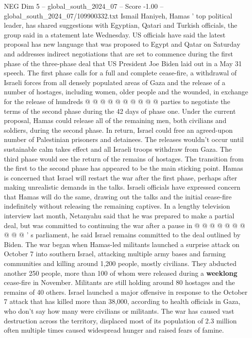 \begin{textsample}{NEG Dim 5 – global\_south\_2024\_07 – Score -1.00 – global\_south\_2024\_07/109900332.txt}
Ismail Haniyeh, Hamas ' top political leader, has shared suggestions with Egyptian, Qatari and Turkish officials, the group said in a statement late Wednesday.
US officials have said the latest proposal has new language that was proposed to Egypt and Qatar on Saturday and addresses indirect negotiations that are set to commence during the first phase of the three-phase deal that US President Joe Biden laid out in a May 31 speech.
The first phase calls for a full and complete cease-fire, a withdrawal of Israeli forces from all densely populated areas of Gaza and the release of a number of hostages, including women, older people and the wounded, in exchange for the release of hundreds @ @ @ @ @ @ @ @ @ @ parties to negotiate the terms of the second phase during the 42 days of phase one.
Under the current proposal, Hamas could release all of the remaining men, both civilians and soldiers, during the second phase.
In return, Israel could free an agreed-upon number of Palestinian prisoners and detainees.
The releases wouldn't occur until sustainable calm takes effect and all Israeli troops withdraw from Gaza.
The third phase would see the return of the remains of hostages.
The transition from the first to the second phase has appeared to be the main sticking point.
Hamas is concerned that Israel will restart the war after the first phase, perhaps after making unrealistic demands in the talks.
Israeli officials have expressed concern that Hamas will do the same, drawing out the talks and the initial cease-fire indefinitely without releasing the remaining captives.
In a lengthy television interview last month, Netanyahu said that he was prepared to make a partial deal, but was committed to continuing the war after a pause in @ @ @ @ @ @ @ @ @ @ ' s parliament, he said Israel remains committed to the deal outlined by Biden.
The war began when Hamas-led militants launched a surprise attack on October 7 into southern Israel, attacking multiple army bases and farming communities and killing around 1,200 people, mostly civilians.
They abducted another 250 people, more than 100 of whom were released during a \textbf{weeklong} cease-fire in November.
Militants are still holding around 80 hostages and the remains of 40 others.
Israel launched a major offensive in response to the October 7 attack that has killed more than 38,000, according to health officials in Gaza, who don't say how many were civilians or militants.
The war has caused vast destruction across the territory, displaced most of its population of 2.3 million often multiple times caused widespread hunger and raised fears of famine.

\end{textsample}
